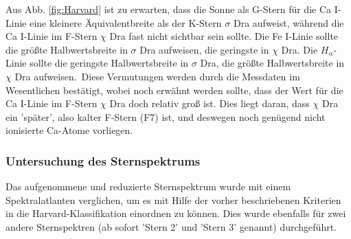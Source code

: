 Aus Abb. \ref{fig:Harvard} ist zu erwarten, dass die Sonne als G-Stern für die Ca I-Linie eine kleinere Äquivalentbreite als der K-Stern $\sigma$ Dra aufweist, während die Ca I-Linie im F-Stern $\chi$ Dra fast nicht sichtbar sein sollte. Die Fe I-Linie sollte die größte Halbwertsbreite in $\sigma$ Dra aufweisen, die geringste in $\chi$ Dra. Die $H_\alpha$-Linie sollte die geringste Halbwertsbreite in $\sigma$ Dra, die größte Halbwertsbreite in $\chi$ Dra aufweisen.\
Diese Vermutungen werden durch die Messdaten im Wesentlichen bestätigt, wobei noch erwähnt werden sollte, dass der Wert für die Ca I-Linie im F-Stern $\chi$ Dra doch relativ groß ist. Dies liegt daran, dass $\chi$ Dra ein 'später', also kalter F-Stern (F7) ist, und deswegen noch genügend nicht ionisierte Ca-Atome vorliegen.
\subsubsection{Untersuchung des Sternspektrums}
Das aufgenommene und reduzierte Sternspektrum wurde mit einem Spektralatlanten verglichen, um es mit Hilfe der vorher beschriebenen Kriterien in die Harvard-Klassifikation einordnen zu können. Dies wurde ebenfalls für zwei andere Sternspektren (ab sofort 'Stern 2' und 'Stern 3' genannt) durchgeführt.

